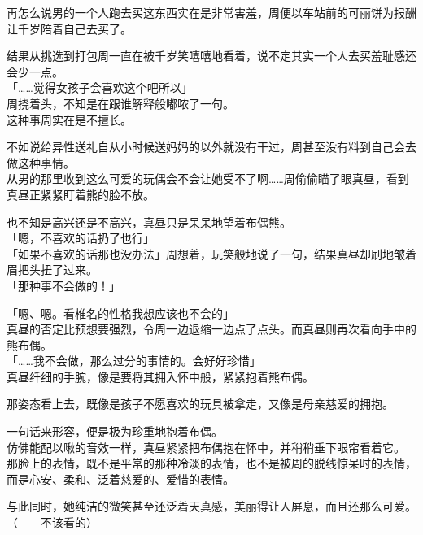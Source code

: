 再怎么说男的一个人跑去买这东西实在是非常害羞，周便以车站前的可丽饼为报酬让千岁陪着自己去买了。

结果从挑选到打包周一直在被千岁笑嘻嘻地看着，说不定其实一个人去买羞耻感还会少一点。\\

「……觉得女孩子会喜欢这个吧所以」\\

周挠着头，不知是在跟谁解释般嘟哝了一句。\\

这种事周实在是不擅长。

不如说给异性送礼自从小时候送妈妈的以外就没有干过，周甚至没有料到自己会去做这种事情。\\

从男的那里收到这么可爱的玩偶会不会让她受不了啊……周偷偷瞄了眼真昼，看到真昼正紧紧盯着熊的脸不放。

也不知是高兴还是不高兴，真昼只是呆呆地望着布偶熊。\\

「嗯，不喜欢的话扔了也行」\\

「如果不喜欢的话那也没办法」周想着，玩笑般地说了一句，结果真昼却刷地皱着眉把头扭了过来。\\

「那种事不会做的！」

「嗯、嗯。看椎名的性格我想应该也不会的」\\

真昼的否定比预想要强烈，令周一边退缩一边点了点头。而真昼则再次看向手中的熊布偶。\\

「……我不会做，那么过分的事情的。会好好珍惜」\\

真昼纤细的手腕，像是要将其拥入怀中般，紧紧抱着熊布偶。

那姿态看上去，既像是孩子不愿喜欢的玩具被拿走，又像是母亲慈爱的拥抱。

一句话来形容，便是极为珍重地抱着布偶。\\

仿佛能配以啾的音效一样，真昼紧紧把布偶抱在怀中，并稍稍垂下眼帘看着它。\\

那脸上的表情，既不是平常的那种冷淡的表情，也不是被周的脱线惊呆时的表情，而是心安、柔和、泛着慈爱的、爱惜的表情。

与此同时，她纯洁的微笑甚至还泛着天真感，美丽得让人屏息，而且还那么可爱。\\

（——不该看的）

